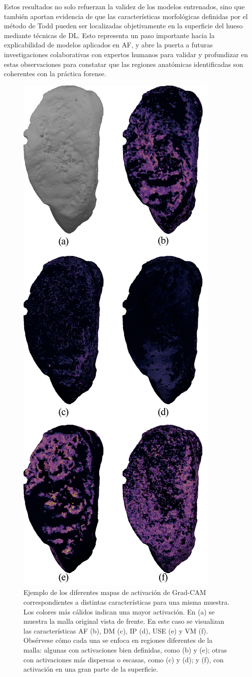 Estos resultados no solo refuerzan la validez de los modelos entrenados, sino que también aportan evidencia de que las características morfológicas definidas por el método de Todd pueden ser localizadas objetivamente en la superficie del hueso mediante técnicas de DL. Esto representa un paso importante hacia la explicabilidad de modelos aplicados en AF, y abre la puerta a futuras investigaciones colaborativas con expertos humanos para validar y profundizar en estas observaciones para constatar que las regiones anatómicas identificadas son coherentes con la práctica forense.

\begin{figure}[p]
    \centering
    \includegraphics[width=0.55\linewidth]{data/grad-cam-53-example.png}
    \caption[Ejemplo de los diferentes mapas de activación de Grad-CAM correspondientes a distintas características para una misma muestra]{Ejemplo de los diferentes mapas de activación de Grad-CAM correspondientes a distintas características para una misma muestra. Los colores más cálidos indican una mayor activación. En (a) se muestra la malla original vista de frente. En este caso se visualizan las características AF (b), DM (c), IP (d), USE (e) y VM (f). Obsérvese cómo cada una se enfoca en regiones diferentes de la malla: algunas con activaciones bien definidas, como (b) y (e); otras con activaciones más dispersas o escasas, como (c) y (d); y (f), con activación en una gran parte de la superficie.}
    \label{fig5:grad_cam__diff_chars}
\end{figure}

